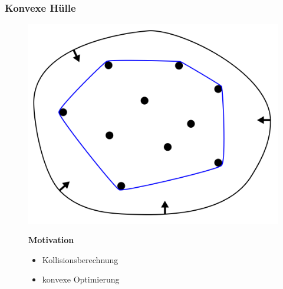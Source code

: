 \begin{frame}
	\frametitle{Konvexe Hülle}
\begin{figure}[htbp]
  \centering
  \begin{minipage}[b]{.48\linewidth}
    \includegraphics[width=\linewidth]{bilder/konvexeHuelle.png}
  \end{minipage}
  \hfill
  \begin{minipage}[b]{.48\linewidth}
\textbf{Motivation}
\begin{itemize}
	\item Kollisionsberechnung
	\item konvexe Optimierung
\end{itemize}
\hspace{0pt}\\\\
\end{minipage}
\end{figure}
\end{frame}



